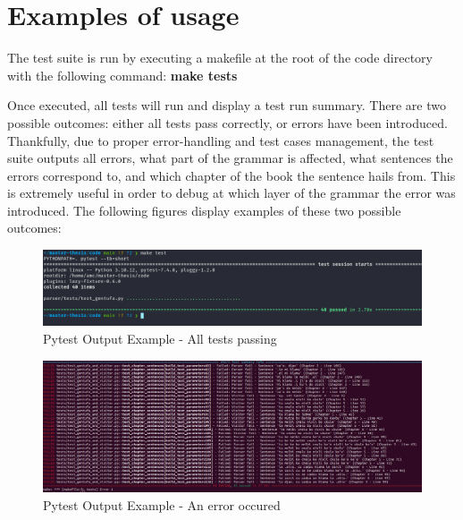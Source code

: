 \newpage

\section{Examples of usage}

The test suite is run by executing a makefile at the root of the code directory with the following command: \textbf{make tests}\newline

Once executed, all tests will run and display a test run summary. There are two possible outcomes: either all tests pass correctly,
or errors have been introduced. Thankfully, due to proper error-handling and test cases management, the test suite outputs all errors,
what part of the grammar is affected, what sentences the errors correspond to,
and which chapter of the book the sentence hails from. This is extremely useful in order to debug at
which layer of the grammar the error was introduced. The following figures display examples of these two possible outcomes:\newline

\begin{figure}[H]
\hspace{-1.1cm}
\includegraphics[scale=0.43]{images/pytest_output_pass.png}
\caption{Pytest Output Example - All tests passing}
\end{figure}

\begin{figure}[H]
\hspace{-1.8cm}
\includegraphics[scale=0.30]{images/pytest_output_fail.png}
\caption{Pytest Output Example - An error occured}
\end{figure}